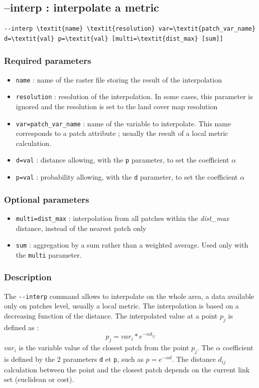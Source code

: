 \documentclass[a4paper,10pt]{report}
\begin{document}
\subsection{--interp : interpolate a metric}
\begin{Verbatim}[commandchars=\\\{\}]
--interp \textit{name} \textit{resolution} var=\textit{patch_var_name} d=\textit{val} p=\textit{val} [multi=\textit{dist_max} [sum]]
\end{Verbatim}

\subsubsection{Required parameters}
\begin{itemize}
	\item \verb|name| : name of the raster file storing the result of the interpolation
	\item \verb|resolution| : resolution of the interpolation. In some cases, this parameter is ignored and the resolution is set to the land cover map resolution
	\item \verb|var=patch_var_name| : name of the variable to interpolate. This name corresponds to a patch attribute ; usually the result of a local metric calculation.
	\item \verb|d=val| : distance allowing, with the \verb|p| parameter, to set the coefficient $\alpha$ 
	\item \verb|p=val| : probability allowing, with the \verb|d| parameter, to set the coefficient $\alpha$ 
\end{itemize}

\subsubsection{Optional parameters}
\begin{itemize}
	\item \verb|multi=dist_max| : interpolation from all patches within the \textit{dist\_max} distance, instead of the nearest patch only
	\item \verb|sum| : aggregation by a sum rather than a weighted average. Used only with the \verb|multi| parameter.
\end{itemize}

\subsubsection{Description}
The \verb|--interp| command allows to interpolate on the whole area, a data available only on patches level, usually a local metric.
The interpolation is based on a decreasing function of the distance. The interpolated value at a point $p_j$ is defined as :
$$p_j = var_i * e^{-\alpha d_{ij}} $$
$var_i$ is the variable value of the closest patch from the point $p_j$. The  $\alpha$ coefficient is defined by the 2 parameters \verb|d| et \verb|p|, such as $p={e}^{-\alpha d}$.
The distance $d_{ij}$ calculation between the point and the closest patch depends on the current link set (euclidean or cost).
\end{document}
